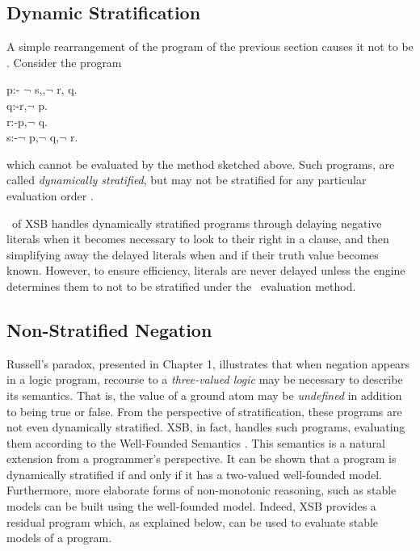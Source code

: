 \subsection{Dynamic Stratification}

A simple rearrangement of the program of the previous section causes
it not to be \LRD.  Consider the program
\begin{center}
\begin{Prog}
p:- $\neg$ s,,$\neg$ r, q.\\
q:-r,$\neg$ p. \\ 
r:-p,$\neg$ q. \\
s:-$\neg$ p,$\neg$ q,$\neg$ r. \\
\end{Prog}   
\end{center}
which cannot be evaluated by the method sketched above.  Such
programs, are called {\em dynamically stratified}, but may not be
stratified for any particular evaluation order \cite{Przy89d}.

\version\ of XSB handles dynamically stratified programs through
delaying negative literals when it becomes necessary to look to their
right in a clause, and then simplifying away the delayed literals when
and if their truth value becomes known.  However, to ensure
efficiency, literals are never delayed unless the engine determines
them to not to be stratified under the \LRD\ evaluation method.

\subsection{Non-Stratified Negation}

Russell's paradox, presented in Chapter 1, illustrates that when
negation appears in a logic program, recourse to a {\em three-valued
logic} may be necessary to describe its semantics.  That is, the value
of a ground atom may be {\em undefined} in addition to being true or
false.  From the perspective of stratification, these programs are not
even dynamically stratified.  XSB, in fact, handles such programs,
evaluating them according to the Well-Founded Semantics \cite{VGRS91}.
This semantics is a natural extension from a programmer's perspective.
It can be shown that a program is dynamically stratified if and only
if it has a two-valued well-founded model.  Furthermore, more
elaborate forms of non-monotonic reasoning, such as stable models
\cite{GeLi88} can be built using the well-founded model.  Indeed, XSB
provides a residual program which, as explained below, can be used to
evaluate stable models of a program.

